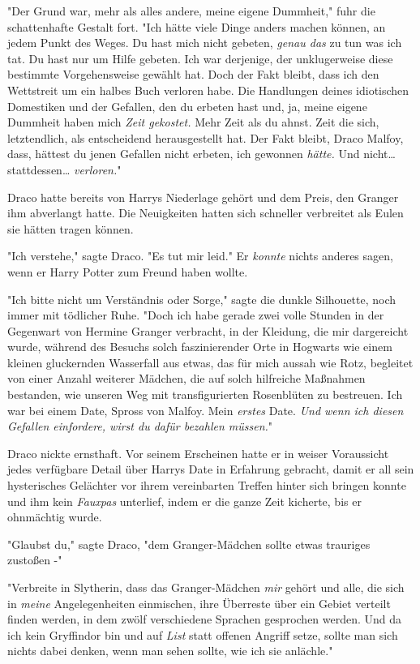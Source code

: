 {"Der Grund war, mehr als alles andere, meine eigene Dummheit," fuhr die schattenhafte Gestalt fort. "Ich hätte viele Dinge anders machen können, an jedem Punkt des Weges. Du hast mich nicht gebeten, \emph{genau das} zu tun was ich tat. Du hast nur um Hilfe gebeten. Ich war derjenige, der unklugerweise diese bestimmte Vorgehensweise gewählt hat. Doch der Fakt bleibt, dass ich den Wettstreit um ein halbes Buch verloren habe. Die Handlungen deines idiotischen Domestiken und der Gefallen, den du erbeten hast und, ja, meine eigene Dummheit haben mich \emph{Zeit gekostet.} Mehr Zeit als du ahnst. Zeit die sich, letztendlich, als entscheidend herausgestellt hat. Der Fakt bleibt, Draco Malfoy, dass, hättest du jenen Gefallen nicht erbeten, ich gewonnen \emph{hätte.} Und nicht… stattdessen… \emph{verloren.}"

Draco hatte bereits von Harrys Niederlage gehört und dem Preis, den Granger ihm abverlangt hatte. Die Neuigkeiten hatten sich schneller verbreitet als Eulen sie hätten tragen können.

"Ich verstehe," sagte Draco. "Es tut mir leid." Er \emph{konnte} nichts anderes sagen, wenn er Harry Potter zum Freund haben wollte.

"Ich bitte nicht um Verständnis oder Sorge," sagte die dunkle Silhouette, noch immer mit tödlicher Ruhe. "Doch ich habe gerade zwei volle Stunden in der Gegenwart von Hermine Granger verbracht, in der Kleidung, die mir dargereicht wurde, während des Besuchs solch faszinierender Orte in Hogwarts wie einem kleinen gluckernden Wasserfall aus etwas, das für mich aussah wie Rotz, begleitet von einer Anzahl weiterer Mädchen, die auf solch hilfreiche Maßnahmen bestanden, wie unseren Weg mit transfigurierten Rosenblüten zu bestreuen. Ich war bei einem Date, Spross von Malfoy. Mein \emph{erstes} Date. \emph{Und wenn ich diesen Gefallen einfordere, wirst du dafür bezahlen müssen.}"

Draco nickte ernsthaft. Vor seinem Erscheinen hatte er in weiser Voraussicht jedes verfügbare Detail über Harrys Date in Erfahrung gebracht, damit er all sein hysterisches Gelächter vor ihrem vereinbarten Treffen hinter sich bringen konnte und ihm kein \emph{Fauxpas} unterlief, indem er die ganze Zeit kicherte, bis er ohnmächtig wurde.

"Glaubst du," sagte Draco, "dem Granger-Mädchen sollte etwas trauriges zustoßen -"

"Verbreite in Slytherin, dass das Granger-Mädchen \emph{mir} gehört und alle, die sich in \emph{meine} Angelegenheiten einmischen, ihre Überreste über ein Gebiet verteilt finden werden, in dem zwölf verschiedene Sprachen gesprochen werden. Und da ich kein Gryffindor bin und auf \emph{List} statt offenen Angriff setze, sollte man sich nichts dabei denken, wenn man sehen sollte, wie ich sie anlächle."

}

